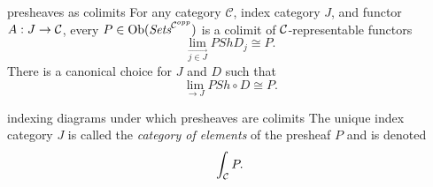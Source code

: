 \begin{frame}
\iftoggle{thmsty}{
\begin{definition}
\label{definition-category-of-elements}
}{}
\begin{block}{presheaves as colimits}
For any category $\mathcal{C}$, index category $J$, and functor $A:J \rightarrow {\mathcal C}$, every $P \in \mathop{\rm Ob}\nolimits(\textit{Sets}^{{\mathcal C}^{opp}})$ is a colimit of ${\mathcal C}$-representable functors
$$
\lim\limits_{\overrightarrow{j \in J}} PSh D_j \cong P.
$$
There is a canonical choice for $J$ and $D$ such that
$$
\lim\limits_{\rightarrow{J}} PSh \circ D \cong P.
$$
\end{block}
\begin{block}{indexing diagrams under which presheaves are colimits} 
The unique index category $J$ is called the {\it category of elements} of the presheaf $P$ and is denoted
$$
\int_{{\mathcal C}} P.
$$
\end{block}
\end{frame}